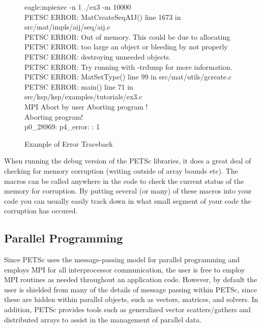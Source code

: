 \begin{figure}[H]
\begin{tabbing}
   eagle:mpiexec -n 1 ./ex3 -m 10000\\
   PETSC ERROR: MatCreateSeqAIJ() line 1673 in src/mat/impls/aij/seq/aij.c\\
   PETSC ERROR:   Out of memory. This could be due to allocating\\
   PETSC ERROR:   too large an object or bleeding by not properly\\
   PETSC ERROR:   destroying unneeded objects.\\
   PETSC ERROR:   Try running with -trdump for more information.\\ 
   PETSC ERROR: MatSetType() line 99 in src/mat/utils/gcreate.c  \\
   PETSC ERROR: main() line 71 in src/ksp/ksp/examples/tutorials/ex3.c\\  
   MPI Abort by user Aborting program !\\
   Aborting program! \\
   p0\_28969:  p4\_error: : 1
\end{tabbing}
\nobreak
\caption{Example of Error Traceback}
\label{fig_traceback}
\end{figure}

When running the debug version of the PETSc libraries, it
does a great deal of checking for memory corruption (writing outside of 
array bounds etc). The macros  can be called 
anywhere in the code to check the current status of the memory for corruption.
By putting several (or many) of these macros into your code you can usually 
easily track down in what small segment of your code the corruption has occured.

\subsection*{Parallel Programming}

Since PETSc uses the message-passing model for
parallel programming and employs MPI for all interprocessor
communication, the user is free to employ MPI routines as needed
throughout an application code.  However, by default the user is
shielded from many of the details of message passing within PETSc,
since these are hidden within parallel objects, such as vectors,
matrices, and solvers.  In addition, PETSc provides tools such as
generalized vector scatters/gathers and distributed arrays to assist
in the management of parallel data.

